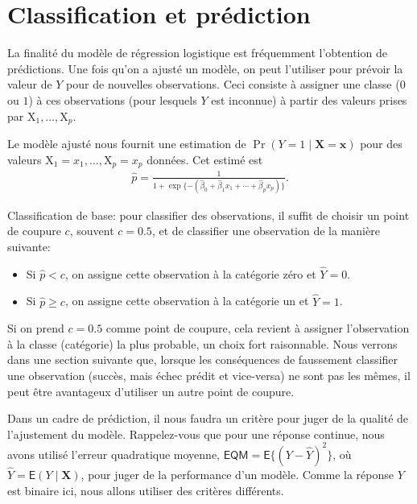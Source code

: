 \documentclass[
  11pt,
  letterpaper,
]{scrbook}
\providecommand{\tightlist}{%
  \setlength{\itemsep}{0pt}\setlength{\parskip}{0pt}}\usepackage{longtable,booktabs,array}
\theoremstyle{definition}
\theoremstyle{remark}
\begin{document}
\section{Classification et
prédiction}\label{classification-et-pruxe9diction}

La finalité du modèle de régression logistique est fréquemment
l'obtention de prédictions. Une fois qu'on a ajusté un modèle, on peut
l'utiliser pour prévoir la valeur de \(Y\) pour de nouvelles
observations. Ceci consiste à assigner une classe (\(0\) ou \(1\)) à ces
observations (pour lesquels \(Y\) est inconnue) à partir des valeurs
prises par \(\mathrm{X}_1, \ldots, \mathrm{X}_p\).

Le modèle ajusté nous fournit une estimation de
\(\Pr(Y=1 \mid \mathbf{X}=\boldsymbol{x})\) pour des valeurs
\(\mathrm{X}_1=x_1, \ldots, \mathrm{X}_p=x_p\) données. Cet estimé est
\begin{align*}
 \widehat{p} = \frac{1}{1+ \exp\{- ( \widehat{\beta}_0 + \widehat{\beta}_1x_1 + \cdots + \widehat{\beta}_p x_p)\}}.
\end{align*}

Classification de base: pour classifier des observations, il suffit de
choisir un point de coupure \(c\), souvent \(c=0.5\), et de classifier
une observation de la manière suivante:

\begin{itemize}
\tightlist
\item
  Si \(\widehat{p} < c\), on assigne cette observation à la catégorie
  zéro et \(\widehat{Y}=0\).
\item
  Si \(\widehat{p} \geq c\), on assigne cette observation à la catégorie
  un et \(\widehat{Y}=1\).
\end{itemize}

Si on prend \(c=0.5\) comme point de coupure, cela revient à assigner
l'observation à la classe (catégorie) la plus probable, un choix fort
raisonnable. Nous verrons dans une section suivante que, lorsque les
conséquences de faussement classifier une observation (succès, mais
échec prédit et vice-versa) ne sont pas les mêmes, il peut être
avantageux d'utiliser un autre point de coupure.

Dans un cadre de prédiction, il nous faudra un critère pour juger de la
qualité de l'ajustement du modèle. Rappelez-vous que pour une réponse
continue, nous avons utilisé l'erreur quadratique moyenne,
\(\mathsf{EQM} = \mathsf{E}\{(Y-\widehat{Y})^2\}\), où
\(\widehat{Y} = \mathsf{E}(Y \mid \mathbf{X})\), pour juger de la
performance d'un modèle. Comme la réponse \(Y\) est binaire ici, nous
allons utiliser des critères différents.
\end{document}
